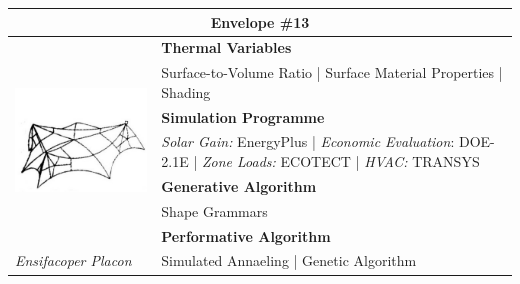 \begin{table}
	\begin{tabular}{ | m{6cm} | m{14cm} |}
	\toprule
	\multicolumn{2}{c}{Envelope \#{}13} \\[1cm] \hline
	\multirow{7}{*}{\includegraphics[width=5.5cm]{./Images/22-Envelope13}} & \textbf{Thermal Variables} \\[1cm]
	& Surface-to-Volume Ratio | Surface Material Properties | Shading\vspace{0.5cm}\\ \cline{2-2}
		 & \textbf{Simulation Programme} \\[1cm]
		 & \emph{Solar Gain:} EnergyPlus | \emph{Economic Evaluation}: DOE-2.1E | \emph{Zone Loads:} ECOTECT | \emph{HVAC:} TRANSYS \vspace{0.5cm}\\ \cline{2-2}
		 & \textbf{Generative Algorithm} \\[1cm]
		 & Shape Grammars\vspace{0.5cm}\\ \cline{2-2}
		 & \textbf{Performative Algorithm} \\[1cm]
		 \emph{Ensifacoper Placon} &  Simulated Annaeling | Genetic Algorithm\vspace{0.5cm}\\
	\bottomrule
	\end{tabular}
\end{table}

\clearpage


